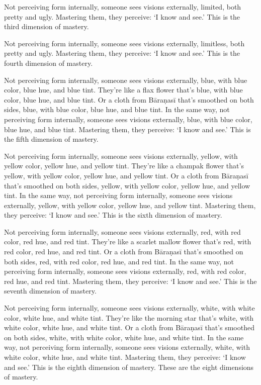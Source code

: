 \documentclass[12pt,openany]{book}%
\begin{document}
Not perceiving form internally, someone sees visions externally, limited, both pretty and ugly. Mastering them, they perceive: ‘I know and see.’ This is the third dimension of mastery. 

Not perceiving form internally, someone sees visions externally, limitless, both pretty and ugly. Mastering them, they perceive: ‘I know and see.’ This is the fourth dimension of mastery. 

Not perceiving form internally, someone sees visions externally, blue, with blue color, blue hue, and blue tint. They’re like a flax flower that’s blue, with blue color, blue hue, and blue tint. Or a cloth from \textsanskrit{Bāraṇasī} that’s smoothed on both sides, blue, with blue color, blue hue, and blue tint. In the same way, not perceiving form internally, someone sees visions externally, blue, with blue color, blue hue, and blue tint. Mastering them, they perceive: ‘I know and see.’ This is the fifth dimension of mastery. 

Not perceiving form internally, someone sees visions externally, yellow, with yellow color, yellow hue, and yellow tint. They’re like a champak flower that’s yellow, with yellow color, yellow hue, and yellow tint. Or a cloth from \textsanskrit{Bāraṇasī} that’s smoothed on both sides, yellow, with yellow color, yellow hue, and yellow tint. In the same way, not perceiving form internally, someone sees visions externally, yellow, with yellow color, yellow hue, and yellow tint. Mastering them, they perceive: ‘I know and see.’ This is the sixth dimension of mastery. 

Not perceiving form internally, someone sees visions externally, red, with red color, red hue, and red tint. They’re like a scarlet mallow flower that’s red, with red color, red hue, and red tint. Or a cloth from \textsanskrit{Bāraṇasī} that’s smoothed on both sides, red, with red color, red hue, and red tint. In the same way, not perceiving form internally, someone sees visions externally, red, with red color, red hue, and red tint. Mastering them, they perceive: ‘I know and see.’ This is the seventh dimension of mastery. 

Not perceiving form internally, someone sees visions externally, white, with white color, white hue, and white tint. They’re like the morning star that’s white, with white color, white hue, and white tint. Or a cloth from \textsanskrit{Bāraṇasī} that’s smoothed on both sides, white, with white color, white hue, and white tint. In the same way, not perceiving form internally, someone sees visions externally, white, with white color, white hue, and white tint. Mastering them, they perceive: ‘I know and see.’ This is the eighth dimension of mastery. These are the eight dimensions of mastery. 
\end{document}
